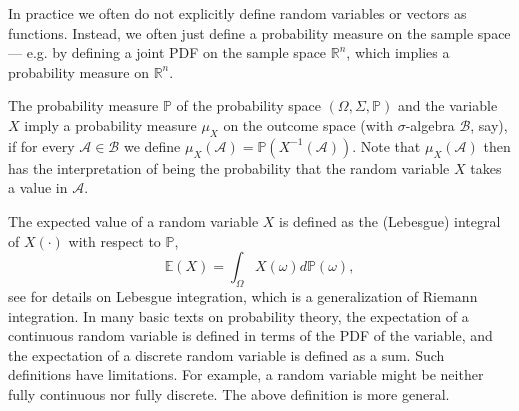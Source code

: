 \documentclass[11pt]{article}
\theoremstyle{plain}
\theoremstyle{definition}
\newtheorem{example}{Example}[section]
\newcommand{\reals}{\mathbb{R}}
\newcommand{\X}{\mathcal{X}}
\newcommand{\pr}{\mathbb{P}}
\newcommand{\citt}{\citet}
\begin{document}


In practice we often do not explicitly define random variables or vectors as functions. Instead, we often just define a probability measure on the sample space --- e.g. by defining a joint PDF on the sample space $\reals^n$, which implies a probability measure on  $\reals^n$. 



The probability measure $\pr$ of the probability space $(\Omega, \Sigma, \pr)$ and the variable $X$ imply a probability measure $\mu_X$ on the outcome space (with $\sigma$-algebra $\mathcal{B}$, say), if for every $\mathcal{A}\in \mathcal{B}$ we define $\mu_X(\mathcal{A})=\pr(X^{-1}(\mathcal{A}))$. Note that $\mu_X(\mathcal{A})$ then has the interpretation of being the probability that the random variable $X$ takes a value in $\mathcal{A}$. 

The expected value of a random variable $X$ is defined as the (Lebesgue) integral of $X(\cdot)$ with respect to $\pr$,
$$\mathbb{E}(X) =\int_{\Omega} X(\omega) d\pr(\omega),$$
see \citt{spreij2023measure} for details on Lebesgue integration, which is a generalization of Riemann integration. 
In many basic texts on probability theory, the expectation of a continuous random variable is defined in terms of the PDF of the variable, and  the expectation of a discrete random variable is defined as a sum. Such definitions have limitations. For example, a random variable might be neither fully continuous nor fully discrete. %
The above definition is more general. 
\end{document}
